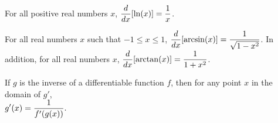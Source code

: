 \begin{summary}
\item For all positive real numbers $x$, $\displaystyle \frac{d}{dx}[\ln(x)] = \frac{1}{x}$.
\item For all real numbers $x$ such that $-1 \le x \le 1$, $\displaystyle \frac{d}{dx}[\arcsin(x)] = \frac{1}{\sqrt{1-x^2}}$.  In addition, for all real numbers $x$, $\displaystyle \frac{d}{dx}[\arctan(x)] = \frac{1}{1+x^2}$.
\item If $g$ is the inverse of a differentiable function $f$, then for any point $x$ in the domain of $g'$, \\ $\displaystyle g'(x) = \frac{1}{f'(g(x))}.$
\end{summary}

\clearpage

 

\cleardoublepage